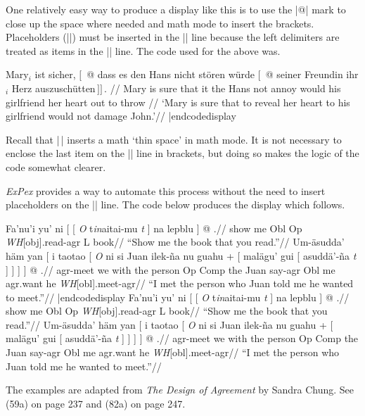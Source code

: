 One relatively easy way to produce a display like this is to use
the |@| mark to close up the space where needed and math mode to
insert the brackets.  Placeholders (|{}|) must be inserted in the
|\glb| line because the left delimiters are treated as items in
the |\gla| line.  The code used for the above was.

\codedisplay
\ex[glstyle=wrap]
\begingl
\gla Mary$_i$ ist sicher, $[\,$ @ dass es den Hans nicht st\"oren
w\"urde $[\,$ @ seiner Freundin ihr$_i$ Herz
{auszusch\"utten$\,]]\,.$} //
\glb Mary is sure {} that it the Hans not annoy would {} his
girlfriend her heart {out to throw} //
\glft `Mary is sure that to reveal her heart to his girlfriend
would not damage John.'//
\endgl
\xe
|endcodedisplay

\noindent Recall that |\,| inserts a math `thin space' in math
mode. It is not necessary to enclose the last item on the |\gla|
line in brackets, but doing so makes the logic of the code
somewhat clearer.

{\it ExPex\/} provides a way to automate this process without the
need to insert placeholders on the |\glb| line. The code below
produces the display which follows.

\codedisplay
\pex[glstyle=wrap,everygla=,nopreamble]
\a \begingl       %
\gla Fa'nu'i yu' ni [ [ {\it O} t{\it in\/}aitai-mu {\it t\/} ] na
lepblu ] @ .//
\glb show me Obl Op {\it WH\/}[obj].read-agr {} L book//
\glft ``Show me the book that you read.''//
\endgl
\a \begingl       %
\gla Um-\"asudda' h\"am yan [ i taotao [ {\it O\/} ni si Juan
ilek-\~na nu guahu + [ mal\"agu' gui [ asudd\"a'-\~na {\it
t\/} ] ] ] ] @ .//
\glb agr-meet we with the person Op Comp the Juan say-agr Obl me
agr.want he {\it WH\/}[obl].meet-agr//
\glft ``I met the person who Juan told me he wanted to meet.''//
\endgl
\xe
|endcodedisplay
\framedisplay
\pex[glstyle=wrap,everygla=,nopreamble]
\a \begingl       %
\gla Fa'nu'i yu' ni [ [ {\it O} t{\it in\/}aitai-mu {\it t\/} ] na
lepblu ] @ .//
\glb show me Obl Op {\it WH\/}[obj].read-agr {} L book//
\glft ``Show me the book that you read.''//
\endgl
\a \begingl       %
\gla Um-\"asudda' h\"am yan [ i taotao [ {\it O\/} ni si Juan
ilek-\~na nu guahu + [ mal\"agu' gui [ asudd\"a'-\~na {\it
t\/} ] ] ] ] @ .//
\glb agr-meet we with the person Op Comp the Juan say-agr Obl me
agr.want he {\it WH\/}[obl].meet-agr//
\glft ``I met the person who Juan told me he wanted to meet.''//
\endgl
\xe
\endframedisplay

\noindent The examples are adapted from {\it The Design of
Agreement\/} by Sandra Chung.  See (59a) on page 237 and (82a) on
page 247.


